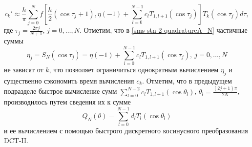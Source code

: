\begin{equation}\label{sms-stn-2-quadratureA_N}
c_k'\approx  \frac h\pi\sum\limits_{j=0}^{N}f\left[\frac h2(\cos\tau_j+1),\eta(-1)+\sum\limits_{l=0}^{N-1}c_l T_{1,l+1}(\cos\tau_j)\right]T_k(\cos\tau_j)d\tau,
\end{equation}
где $\tau_j=\frac{2\pi j}{N+1}$, $j=0,\ldots,N$. Отметим, что в \eqref{sms-stn-2-quadratureA_N} частичные суммы
\begin{equation}\label{sms-stn-2-PartialSolSum}
\eta_j=S_N(\cos\tau_j)=\eta(-1)+\sum\limits_{l=0}^{N-1}c_l T_{1,l+1}(\cos\tau_j),\ j=0,\ldots,N
\end{equation}
не зависят от $k$, что позволяет ограничиться однократным вычислением $\eta_j$ и существенно сэкономить время вычисления $c_k$. Отметим, что в предыдущем подразделе быстрое вычисление сумм $\sum_{l=0}^{N-2}c_l T_{1,l+1}(\cos\theta_l)$, $\theta_l=\frac{(2j+1)\pi}{2N}$, производилось путем сведения их к сумме
\begin{equation}\label{sms-stn-2-DCT-II}
Q_N(\theta)=\sum_{l=0}^{N-1}d_l T_{l}(\cos\theta_l)
\end{equation}
и ее вычислением с помощью быстрого дискретного косинусного преобразования DCT-II.

